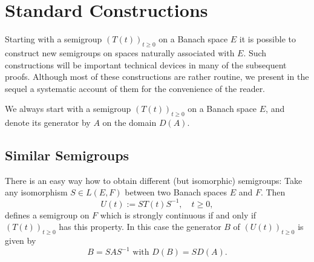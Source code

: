 \documentclass{article}
\begin{document}
\section{Standard Constructions}
Starting with a semigroup $(T(t))_{t \geq 0}$ on a Banach space $E$ it is possible to construct new semigroups on spaces naturally associated with $E$.
Such constructions will be important technical devices in many of the subsequent proofs.
Although most of these constructions are rather routine, we present in the sequel a systematic account of them for the convenience of the reader.

We always start with a semigroup $(T(t))_{t \geq 0}$ on a Banach space $E$, and denote its generator by $A$ on the domain $D(A)$.

\subsection{Similar Semigroups}
There is an easy way how to obtain different (but isomorphic) semigroups: Take any isomorphism $S \in L(E,F)$ between two Banach spaces $E$ and $F$.
Then
\[
U(t) := ST(t)S^{-1}, \quad t \geq 0,
\]
defines a semigroup on $F$ which is strongly continuous if and only if $(T(t))_{t \geq 0}$ has this property.
In this case the generator $B$ of $(U(t))_{t \geq 0}$ is given by
\[
B = SAS^{-1} \text{ with } D(B) = SD(A).
\]
\end{document}
